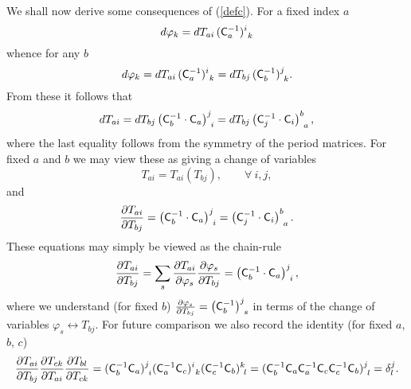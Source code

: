 \documentclass[a4paper,]{article}
\def\d{\partial}
\def\C{{\sf C}}
\begin{document}
We shall now derive some consequences of (\ref{defc}). 
For a fixed index $a$
$$
d\varphi_k = dT_{ai}\,(\C_a\sp{-1})\sp{i}_{\ k}
$$
whence for any $b$
$$
d\varphi_k = dT_{ai}\,(\C_a\sp{-1})\sp{i}_{\ k}
= dT_{bj}\,(\C_b\sp{-1})\sp{j}_{\ k}.
$$
From these it follows that
\begin{equation}
\label{tcct}
dT_{ai} = dT_{bj} \left(\C_b^{-1}\cdot \C_a\right)^j_{\ i}
= dT_{bj}\left(\C_j^{-1}\cdot \C_i\right)^b_{\ a},
\end{equation}
where the last equality follows from the symmetry of the period matrices.
For fixed $a$ and $b$ we may view these as giving a change of variables
\begin{equation}
T_{ai} = T_{ai}(T_{bj}),\qquad\forall\ i , j,
\end{equation}
and
\begin{equation}
\label{tt}
{\d T_{ai}\over\d T_{bj}} = \left(\C_b^{-1}\cdot \C_a\right)^j_{\ i}
=\left(\C_j^{-1}\cdot \C_i\right)^b_{\ a}.
\end{equation}
These equations may simply be viewed as the chain-rule
\begin{equation}
\label{cv}
{\d T_{ai}\over\d T_{bj}} = \sum_s {\d T_{ai}\over\d \varphi_s}
{\d \varphi_s\over\d T_{bj}} = \left(\C_b^{-1}\cdot \C_a\right)^j_{\ i},
\end{equation}
where we understand (for fixed $b$)
${\d \varphi_s\over\d T_{bj}} = \left(\C_b^{-1}\right)^j_{\ s}$
in terms of the change of variables $\varphi_s\leftrightarrow T_{bj}$.
For future comparison we also record the identity (for fixed $a$, $b$, $c$)
\begin{equation}
\label{3cvid}
\dfrac{\d T_{ai}}{\d T_{bj}}\dfrac{\d T_{ck}}{\d T_{ai}}
\dfrac{\d T_{bl}}{\d T_{ck}}
= (\C_b\sp{-1} \C_a)\sp{j}_{\ i} (\C_a\sp{-1} \C_c)\sp{i} _{\ k}
(\C_c\sp{-1} \C_b)\sp{k} _{\ l}
=(\C_b\sp{-1} \C_a \C_a\sp{-1} \C_c \C_c\sp{-1} \C_b)\sp{j} _{\ l}
=  \delta\sp{j} _l.
\end{equation}
\end{document}
